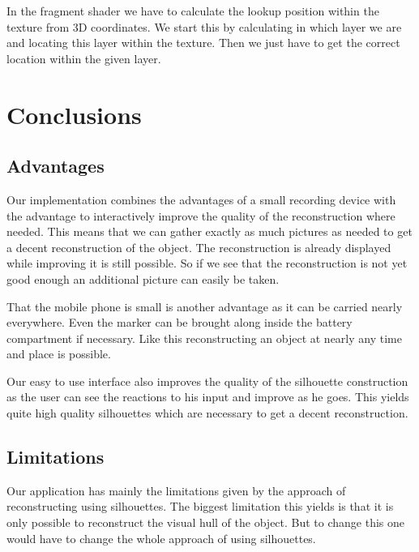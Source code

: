 \documentclass[10pt,twocolumn,letterpaper]{article}
\begin{document}
In the fragment shader we have to calculate the lookup position within the texture from 3D coordinates. We start this by calculating in which layer we are and locating this layer within the texture. Then we just have to get the correct location within the given layer.

\section{Conclusions}

\subsection{Advantages}

Our implementation combines the advantages of a small recording device with the advantage to interactively improve the quality of the reconstruction where needed. This means that we can gather exactly as much pictures as needed to get a decent reconstruction of the object. The reconstruction is already displayed while improving it is still possible. So if we see that the reconstruction is not yet good enough an additional picture can easily be taken.

That the mobile phone is small is another advantage as it can be carried nearly everywhere. Even the marker can be brought along inside the battery compartment if necessary. Like this reconstructing an object at nearly any time and place is possible.

Our easy to use interface also improves the quality of the silhouette construction as the user can see the reactions to his input and improve as he goes. This yields quite high quality silhouettes which are necessary to get a decent reconstruction.

\subsection{Limitations}

Our application has mainly the limitations given by the approach of reconstructing using silhouettes. The biggest limitation this yields is that it is only possible to reconstruct the visual hull of the object. But to change this one would have to change the whole approach of using silhouettes.
\end{document}
